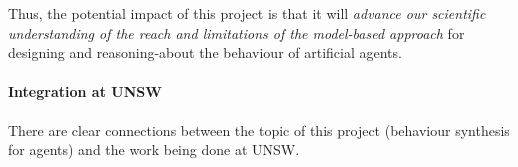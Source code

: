 \documentclass[a4paper,12pt,smallheadings]{scrartcl}
\newcommand\aside[1]{\textcolor{red}{#1}}
\begin{document}


Thus, the potential impact of this project is that it will \emph{advance our scientific understanding of the reach and limitations of the model-based approach} for designing and reasoning-about the behaviour of artificial agents.

\paragraph{Integration at UNSW}

There are clear connections between the topic of this project (behaviour synthesis for agents) and the work 
being done at UNSW. 

\end{document}
